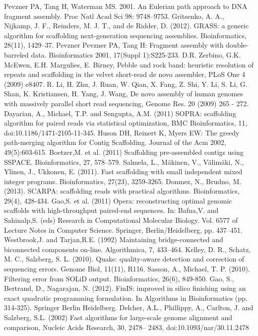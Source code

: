 \documentclass[11pt]{article}
\begin{document}
\begin{thebibliography}{widest entry}
   Pevzner PA, Tang H, Waterman MS. 2001. An
    Eulerian path approach to DNA fragment assembly. Proc Natl Acad Sci 98:
    9748–9753.
   Gritsenko, A. A., Nijkamp, J. F., Reinders, M. J. T.,
    and de Ridder, D. (2012). GRASS: a generic algorithm for scaffolding
    next-generation sequencing assemblies.  Bioinformatics, 28(11), 1429–37.
   Pevzner Pevzner PA, Tang H: Fragment assembly with
    double-barreled data. Bioinformatics 2001, 17(Suppl 1):S225-233.
   D.R. Zerbino, G.K. McEwen, E.H. Margulies, E.
    Birney, Pebble and rock band: heuristic resolution of repeats and
    scaffolding in the velvet short-read de novo assembler, PLoS One 4 (2009)
    e8407.
   R. Li, H. Zhu, J. Ruan, W. Qian, X. Fang, Z. Shi, Y. Li,
    S. Li, G.  Shan, K. Kristiansen, H.  Yang, J. Wang, De novo assembly of
    human genomes with massively parallel short read sequencing, Genome Res. 20
    (2009) 265 - 272.
   Dayarian, A., Michael, T.P. and Sengupta, A.M. (2011) SOPRA:
    scaffolding algorithm for paired reads via statistical optimization, BMC
    Bioinformatics, 11, doi:10.1186/1471-2105-11-345.
   Huson DH, Reinert K, Myers EW: The greedy
    path-merging algorithm for Contig Scaffolding. Journal of the Acm 2002,
    49(5):603-615.
   Boetzer,M. et al. (2011) Scaffolding pre-assembled contigs
    using SSPACE.  Bioinformatics, 27, 578–579.
   Salmela, L., Mäkinen, V., Välimäki, N., Ylinen, J., Ukkonen,
    E. (2011). Fast scaffolding with small independent mixed integer programs.
    Bioinformatics, 27(23), 3259-3265.
   Donmez, N., Brudno, M. (2013). SCARPA: scaffolding reads
    with practical algorithms. Bioinformatics, 29(4), 428-434.
   Gao,S. et al. (2011) Opera: reconstructing optimal genomic
    scaffolds with high-throughput paired-end sequences. In: Bafna,V. and
    Sahinalp,S. (eds) Research in Computational Molecular Biology. Vol. 6577 of
    Lecture Notes in Computer Science. Springer, Berlin/Heidelberg, pp. 437–451.
   Westbrook,J. and Tarjan,R.E. (1992) Maintaining
    bridge-connected and biconnected components on-line. Algorithmica, 7,
    433–464.
   Kelley, D. R., Schatz, M. C., Salzberg, S. L. (2010). Quake:
    quality-aware detection and correction of sequencing errors. Genome Biol,
    11(11), R116.
   Sasson, A., Michael, T. P. (2010). Filtering error
    from SOLiD output. Bioinformatics, 26(6), 849-850.
   Gao, S., Bertrand, D., Nagarajan, N. (2012). FinIS: improved
    in silico finishing using an exact quadratic programming formulation. In
    Algorithms in Bioinformatics (pp. 314-325). Springer Berlin Heidelberg.
   Delcher, A.L., Phillippy, A., Carlton, J. and Salzberg, S.L.
    (2002) Fast algorithms for large-scale genome alignment and comparison,
    Nucleic Acids Research, 30, 2478– 2483, doi:10.1093/nar/30.11.2478
\end{thebibliography}
\end{document}
